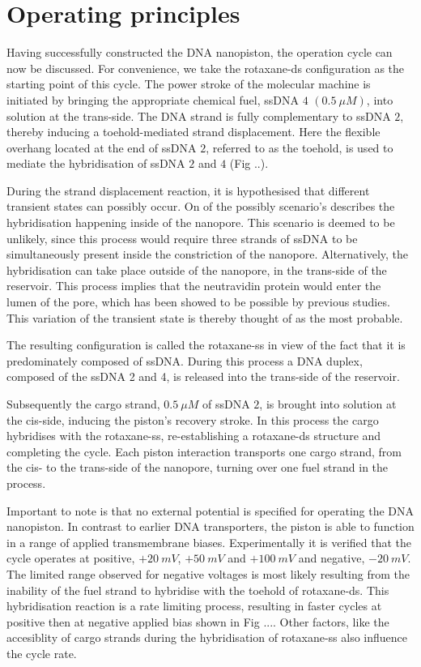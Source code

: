 \section{Operating principles}

Having successfully constructed the DNA nanopiston, the operation cycle can now be
discussed. For convenience, we take the rotaxane-ds configuration as the starting point
of this cycle. The power stroke of the molecular machine is initiated by bringing the
appropriate chemical fuel, ssDNA $4$ $(0.5\ \mu M)$, into solution at the trans-side. The
DNA strand is fully complementary to ssDNA $2$, thereby inducing a toehold-mediated
strand displacement. Here the flexible overhang located at the end of ssDNA $2$, referred
to as the toehold, is used to mediate the hybridisation of ssDNA $2$ and $4$ (Fig ..).

During the strand displacement reaction, it is hypothesised that different transient
states can possibly occur. On of the possibly scenario's describes the hybridisation
happening inside of the nanopore. This scenario is deemed to be unlikely, since this
process would require three strands of ssDNA to be simultaneously present inside the
constriction of the nanopore. Alternatively, the hybridisation can take place outside of
the nanopore, in the trans-side of the reservoir. This process implies that the
neutravidin protein would enter the lumen of the pore, which has been showed to be
possible by previous studies. This variation of the transient state is thereby
thought of as the most probable.

The resulting configuration is called the rotaxane-ss in view of the fact that it is
predominately composed of ssDNA. During this process a DNA duplex, composed of the ssDNA
2 and 4, is released into the trans-side of the reservoir.

Subsequently the cargo strand, $0.5\ \mu M$ of ssDNA $2$,  is brought into solution at
the cis-side, inducing the piston's recovery stroke. In this process the cargo hybridises
with the rotaxane-ss, re-establishing a rotaxane-ds structure and completing the cycle.
Each piston interaction transports one cargo strand, from the cis- to the trans-side of
the nanopore, turning over one fuel strand in the process.

Important to note is that no external potential is specified for operating the DNA
nanopiston. In contrast to earlier DNA transporters, the piston is able to function in a
range of applied transmembrane biases. Experimentally it is verified that the
cycle operates at positive, $+20\ mV$, $+50\ mV$ and $+100\ mV$ and negative, $ - 20\
mV$. The limited range observed for negative voltages is most likely resulting from the
inability of the fuel strand to hybridise with the toehold of rotaxane-ds. This
hybridisation reaction is a rate limiting process, resulting in faster cycles at positive
then at negative applied bias shown in Fig .... Other factors, like the accesiblity of
cargo strands during the hybridisation of rotaxane-ss also influence the cycle rate.


